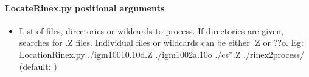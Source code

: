 \documentclass[letterpaper,10pt,english]{sphinxmanual}
\begin{document}
\paragraph{LocateRinex.py positional arguments}
\label{\detokenize{com:LocateRinex.py-positional-arguments}}\begin{itemize}
\item {} 
\sphinxAtStartPar
{\hyperref[\detokenize{com:LocateRinex.py-files}]{}} \sphinxhyphen{} List of files, directories or wildcards to process. If directories are given, searches for .Z files. Individual files or wildcards can be either .Z or ??o. Eg: LocationRinex.py ./igm10010.10d.Z ./igm1002a.10o ./cs*.Z ./rinex2process/ (default: )

\end{itemize}
\end{document}
